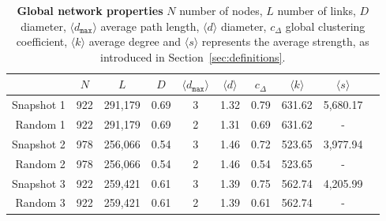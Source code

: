 \begin{table}[htbp]
\small
\centering
\caption[Global network properties]{\textbf{Global network properties} $N$ number of nodes, $L$ number of links, $D$ diameter, $\langle d_{\texttt{max}} \rangle$ average path length, $\langle d \rangle$ diameter, $c_\Delta$ global clustering coefficient, $\langle k \rangle$ average degree and $\langle s \rangle$ represents the average strength, as introduced in Section~\ref{sec:definitions}.}
\label{tab:stats}
\vspace*{5mm}
\begin{tabular}{rccccccccc}
\toprule
{} &  $N$ &   $L$ &  $D$ &  $\langle d_{\texttt{max}} \rangle$ &  $\langle d \rangle$ &   $c_\Delta$ & $\langle k \rangle$ &  $\langle s \rangle$ \\
\midrule
Snapshot 1 & 922 & 291,179 & 0.69 & 3 & 1.32 &  0.79 & 631.62 & 5,680.17 \\
Random 1  & 922 & 291,179 & 0.69 & 2 & 1.31 &  0.69 & 631.62 & - \\ \midrule
Snapshot 2 & 978 & 256,066 & 0.54 & 3 & 1.46 &  0.72 & 523.65 & 3,977.94 \\
Random 2  & 978 & 256,066 & 0.54 & 2 & 1.46 &  0.54 & 523.65 & - \\ \midrule
Snapshot 3 & 922 & 259,421 & 0.61 & 3 & 1.39 &  0.75 & 562.74 & 4,205.99 \\
Random 3  & 922 & 259,421 & 0.61 & 2 & 1.39 &  0.61 & 562.74 & - \\
\bottomrule
\end{tabular}
\end{table}